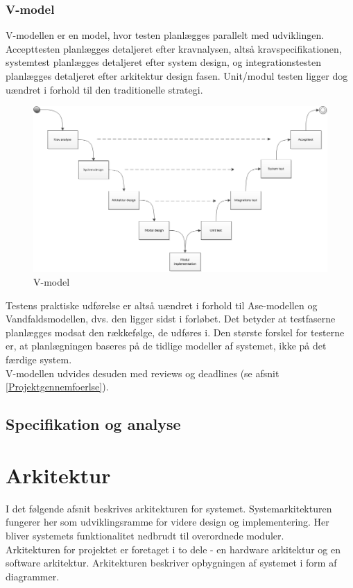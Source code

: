 \subsection{V-model}
V-modellen er en model, hvor testen planlægges parallelt med udviklingen. Accepttesten planlægges detaljeret efter kravnalysen, altså kravspecifikationen, systemtest planlægges detaljeret efter system design, og integrationstesten planlægges detaljeret efter arkitektur design fasen. Unit/modul testen ligger dog uændret i forhold til den traditionelle strategi.
\begin{figure}[H]
	\centering
	\includegraphics[width=1\textwidth]{Figurer/Metode/Vmodel}
	\caption{V-model}
	\label{Vmodel}
\end{figure}
Testens praktiske udførelse er altså uændret i forhold til Ase-modellen og Vandfaldsmodellen, dvs. den ligger sidst i forløbet. Det betyder at testfaserne planlægges modsat den rækkefølge, de udføres i. Den største forskel for testerne er, at planlægningen baseres på de tidlige modeller af systemet, ikke på det færdige system. \\
 V-modellen udvides desuden med reviews og deadlines (se afsnit \ref{Projektgennemfoerlse}).

\section{Specifikation og analyse}



\chapter{Arkitektur}
I det følgende afsnit beskrives arkitekturen for systemet. Systemarkitekturen fungerer her som udviklingsramme for videre design og implementering. Her bliver systemets funktionalitet 
nedbrudt til overordnede moduler. \\
   Arkitekturen for projektet er foretaget i to dele - en hardware arkitektur og en software arkitektur. Arkitekturen beskriver opbygningen af systemet i form af diagrammer.  
   
